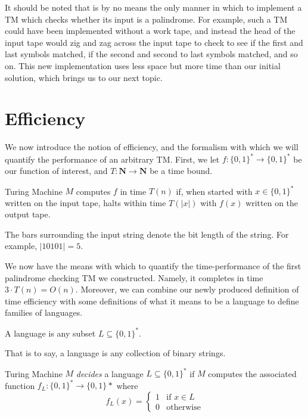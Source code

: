\documentclass[usletter]{article}
\begin{document}
It should be noted that is by no means the only manner in which to implement a TM which checks whether its input is a palindrome. For example, such a TM could have been implemented without a work tape, and instead the head of the input tape would zig and zag across the input tape to check to see if the first and last symbols matched, if the second and second to last symbols matched, and so on. This new implementation uses less space but more time than our initial solution, which brings us to our next topic.

\section{Efficiency}

We now introduce the notion of efficiency, and the formalism with which we will quantify the performance of an arbitrary TM. First, we let $f : \{0,1\}^* \rightarrow \{0,1\}^*$ be our function of interest, and $T : \mathbf{N} \rightarrow \mathbf{N}$ be a time bound.

\begin{definition}
Turing Machine $M$ computes $f$ in time $T(n)$ if, when started with $x \in \{0,1\}^*$ written on the input tape, halts within time $T(|x|)$ with $f(x)$ written on the output tape.
\end{definition}

The bars surrounding the input string denote the bit length of the string. For example, $|10101| = 5$.

We now have the means with which to quantify the time-performance of the first palindrome checking TM we constructed. Namely, it completes in time $3\cdot T(n) = O(n)$. Moreover, we can combine our newly produced definition of time efficiency with some definitions of what it means to be a language to define families of languages.

\begin{definition}
A language is any subset $L \subseteq \{0,1\}^*$.
\end{definition}

That is to say, a language is any collection of binary strings.

\begin{definition}
Turing Machine $M$ \emph{decides} a language $L \subseteq \{0,1\}^*$ if $M$ computes the associated function $f_L : \{0,1\}^* \rightarrow \{0,1\}*$ where
\[f_L(x)= \begin{cases} 
      1 & \text{if } x \in L \\
      0 & \text{otherwise}
   \end{cases}
\]
\end{definition}
\end{document}
